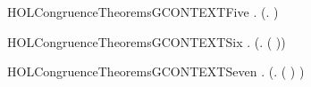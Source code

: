 \newcommand{\HOLCongruenceTheoremsGCONTEXTFour}{\UseVerbatim{HOLCongruenceTheoremsGCONTEXTFour}}
\begin{SaveVerbatim}{HOLCongruenceTheoremsGCONTEXTFive}
\HOLTokenTurnstile{} \HOLSymConst{\HOLTokenForall{}} .
         \HOLSymConst{\HOLTokenConj{}}   \HOLSymConst{\HOLTokenImp{}}  (\HOLTokenLambda{}.   \HOLSymConst{\ensuremath{\parallel}}  )
\end{SaveVerbatim}
\newcommand{\HOLCongruenceTheoremsGCONTEXTFive}{\UseVerbatim{HOLCongruenceTheoremsGCONTEXTFive}}
\begin{SaveVerbatim}{HOLCongruenceTheoremsGCONTEXTSix}
\HOLTokenTurnstile{} \HOLSymConst{\HOLTokenForall{}} .   \HOLSymConst{\HOLTokenImp{}}  (\HOLTokenLambda{}. \HOLConst{\ensuremath{\nu}}  ( ))
\end{SaveVerbatim}
\newcommand{\HOLCongruenceTheoremsGCONTEXTSix}{\UseVerbatim{HOLCongruenceTheoremsGCONTEXTSix}}
\begin{SaveVerbatim}{HOLCongruenceTheoremsGCONTEXTSeven}
\HOLTokenTurnstile{} \HOLSymConst{\HOLTokenForall{}} .   \HOLSymConst{\HOLTokenImp{}}  (\HOLTokenLambda{}.  ( ) )
\end{SaveVerbatim}
\newcommand{\HOLCongruenceTheoremsGCONTEXTSeven}{\UseVerbatim{HOLCongruenceTheoremsGCONTEXTSeven}}
